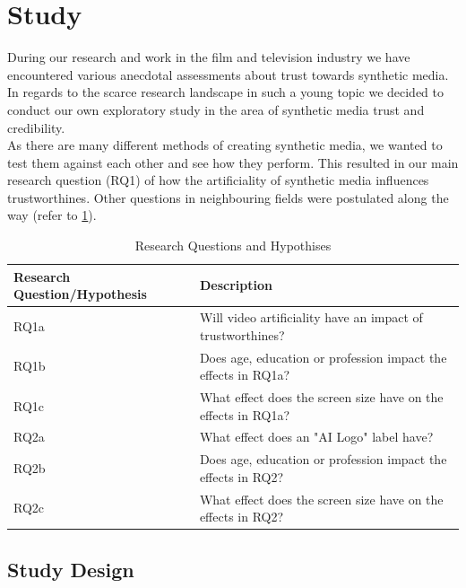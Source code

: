 \documentclass[
  a4paper,  %
  twoside,  %
  bibliography=totoc,
  headsepline,
  cleardoublepage=empty,
  parskip=half,
  draft=false
]{scrbook}
\begin{document}
\newpage
\section{Study}
\label{chap:study}
During our research and work in the film and television industry we have encountered various anecdotal assessments about trust towards synthetic media. In regards to the scarce research landscape in such a young topic we decided to conduct our own exploratory study in the area of synthetic media trust and credibility. \\
As there are many different methods of creating synthetic media, we wanted to test them against each other and see how they perform. This resulted in our main research question (RQ1) of how the artificiality of synthetic media influences trustworthines. Other questions in neighbouring fields were postulated along the way (refer to \ref{tab:research-questions}).

\begin{table}[h]
  \centering
  \begin{tabularx}{\textwidth}{l|X}
    \textbf{Research Question/Hypothesis} & \textbf{Description}\\
    \midrule
    RQ1a & Will video artificiality have an impact of trustworthines?  \\
    \midrule
    RQ1b & Does age, education or profession impact the effects in RQ1a?  \\
    \midrule
    RQ1c & What effect does the screen size have on the effects in RQ1a?  \\
    \midrule
    RQ2a & What effect does an "AI Logo" label have?\\
    \midrule
    RQ2b & Does age, education or profession impact the effects in RQ2?  \\
    \midrule
    RQ2c & What effect does the screen size have on the effects in RQ2?  \\
  \end{tabularx}
  \caption{Research Questions and Hypothises}
  \label{tab:research-questions}
\end{table}

\subsection{Study Design}
\label{subsec:study design}
\end{document}
